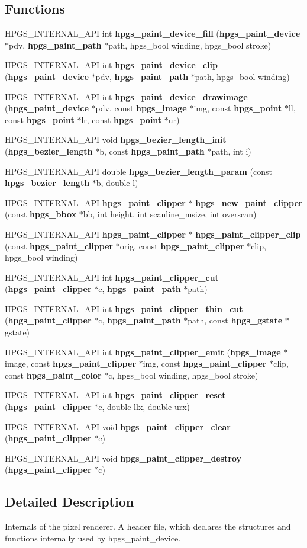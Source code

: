 \subsection*{Functions}
\begin{DoxyCompactItemize}
\item 
HPGS\_\-INTERNAL\_\-API int {\bf hpgs\_\-paint\_\-device\_\-fill} ({\bf hpgs\_\-paint\_\-device} $\ast$pdv, {\bf hpgs\_\-paint\_\-path} $\ast$path, hpgs\_\-bool winding, hpgs\_\-bool stroke)
\item 
HPGS\_\-INTERNAL\_\-API int {\bf hpgs\_\-paint\_\-device\_\-clip} ({\bf hpgs\_\-paint\_\-device} $\ast$pdv, {\bf hpgs\_\-paint\_\-path} $\ast$path, hpgs\_\-bool winding)
\item 
HPGS\_\-INTERNAL\_\-API int {\bf hpgs\_\-paint\_\-device\_\-drawimage} ({\bf hpgs\_\-paint\_\-device} $\ast$pdv, const {\bf hpgs\_\-image} $\ast$img, const {\bf hpgs\_\-point} $\ast$ll, const {\bf hpgs\_\-point} $\ast$lr, const {\bf hpgs\_\-point} $\ast$ur)
\item 
HPGS\_\-INTERNAL\_\-API void {\bf hpgs\_\-bezier\_\-length\_\-init} ({\bf hpgs\_\-bezier\_\-length} $\ast$b, const {\bf hpgs\_\-paint\_\-path} $\ast$path, int i)
\item 
HPGS\_\-INTERNAL\_\-API double {\bf hpgs\_\-bezier\_\-length\_\-param} (const {\bf hpgs\_\-bezier\_\-length} $\ast$b, double l)
\item 
HPGS\_\-INTERNAL\_\-API {\bf hpgs\_\-paint\_\-clipper} $\ast$ {\bf hpgs\_\-new\_\-paint\_\-clipper} (const {\bf hpgs\_\-bbox} $\ast$bb, int height, int scanline\_\-msize, int overscan)
\item 
HPGS\_\-INTERNAL\_\-API {\bf hpgs\_\-paint\_\-clipper} $\ast$ {\bf hpgs\_\-paint\_\-clipper\_\-clip} (const {\bf hpgs\_\-paint\_\-clipper} $\ast$orig, const {\bf hpgs\_\-paint\_\-clipper} $\ast$clip, hpgs\_\-bool winding)
\item 
HPGS\_\-INTERNAL\_\-API int {\bf hpgs\_\-paint\_\-clipper\_\-cut} ({\bf hpgs\_\-paint\_\-clipper} $\ast$c, {\bf hpgs\_\-paint\_\-path} $\ast$path)
\item 
HPGS\_\-INTERNAL\_\-API int {\bf hpgs\_\-paint\_\-clipper\_\-thin\_\-cut} ({\bf hpgs\_\-paint\_\-clipper} $\ast$c, {\bf hpgs\_\-paint\_\-path} $\ast$path, const {\bf hpgs\_\-gstate} $\ast$gstate)
\item 
HPGS\_\-INTERNAL\_\-API int {\bf hpgs\_\-paint\_\-clipper\_\-emit} ({\bf hpgs\_\-image} $\ast$image, const {\bf hpgs\_\-paint\_\-clipper} $\ast$img, const {\bf hpgs\_\-paint\_\-clipper} $\ast$clip, const {\bf hpgs\_\-paint\_\-color} $\ast$c, hpgs\_\-bool winding, hpgs\_\-bool stroke)
\item 
HPGS\_\-INTERNAL\_\-API int {\bf hpgs\_\-paint\_\-clipper\_\-reset} ({\bf hpgs\_\-paint\_\-clipper} $\ast$c, double llx, double urx)
\item 
HPGS\_\-INTERNAL\_\-API void {\bf hpgs\_\-paint\_\-clipper\_\-clear} ({\bf hpgs\_\-paint\_\-clipper} $\ast$c)
\item 
HPGS\_\-INTERNAL\_\-API void {\bf hpgs\_\-paint\_\-clipper\_\-destroy} ({\bf hpgs\_\-paint\_\-clipper} $\ast$c)
\end{DoxyCompactItemize}


\subsection{Detailed Description}
Internals of the pixel renderer. A header file, which declares the structures and functions internally used by {\ttfamily hpgs\_\-paint\_\-device}. 